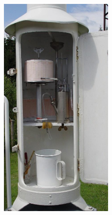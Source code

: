 \begin{figure}[!htbp]
    \centering
    \begin{minipage}{0.15\textwidth} 
        \centering
        \includegraphics[width=\textwidth]{imagenes/pluviografo.png}
        \label{pluviografo}

\end{minipage}
\end{figure}
